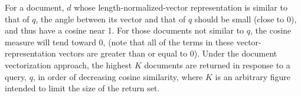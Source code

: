 \noindent
For a document, $d$ whose length-normalized-vector representation is similar to that of $q$, the angle between its vector and that of $q$ should be small (close to 0), and thus have a cosine near 1.  For those documents not similar to $q$, the cosine measure will tend toward 0, (note that all of the terms in these vector-representation vectors are greater than or equal to 0).  Under the document vectorization approach, the highest $K$ documents are returned in response to a query, $q$, in order of decreasing cosine similarity, where $K$ is an arbitrary figure intended to limit the size of the return set.





